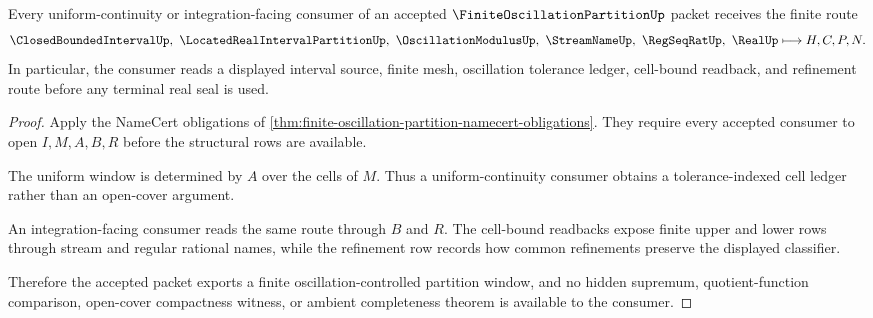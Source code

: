 \begin{theorem}
\label{thm:finite-oscillation-partition-uniform-window}
Every uniform-continuity or integration-facing consumer of an accepted $\FiniteOscillationPartitionUp$ packet receives the finite route
$$
\ClosedBoundedIntervalUp,\ \LocatedRealIntervalPartitionUp,\ \OscillationModulusUp,\ \StreamNameUp,\ \RegSeqRatUp,\ \RealUp \longmapsto H,C,P,N .
$$
In particular, the consumer reads a displayed interval source, finite mesh, oscillation tolerance ledger, cell-bound readback, and refinement route before any terminal real seal is used.
\end{theorem}
\begin{proof}
Apply the NameCert obligations of \autoref{thm:finite-oscillation-partition-namecert-obligations}. They require every accepted consumer to open $I,M,A,B,R$ before the structural rows are available.

The uniform window is determined by $A$ over the cells of $M$. Thus a uniform-continuity consumer obtains a tolerance-indexed cell ledger rather than an open-cover argument.

An integration-facing consumer reads the same route through $B$ and $R$. The cell-bound readbacks expose finite upper and lower rows through stream and regular rational names, while the refinement row records how common refinements preserve the displayed classifier.

Therefore the accepted packet exports a finite oscillation-controlled partition window, and no hidden supremum, quotient-function comparison, open-cover compactness witness, or ambient completeness theorem is available to the consumer.
\end{proof}

